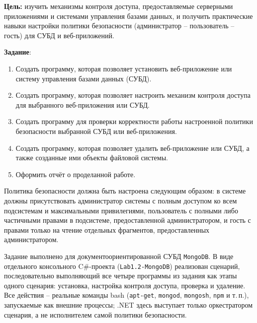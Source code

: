 
\textbf{Цель:} изучить механизмы контроля доступа, предоставляемые
серверными приложениями и системами управления базами данных, и получить
практические навыки настройки политики безопасности (администратор --
пользователь -- гость) для СУБД и веб-приложений.

\vspace{1em}

\textbf{Задание}:
\begin{enumerate}
  \item Создать программу, которая позволяет установить веб-приложение
  или систему управления базами данных (СУБД).
  \item Создать программу, которая позволяет настроить механизм контроля
  доступа для выбранного веб-приложения или СУБД.
  \item Создать программу для проверки корректности работы настроенной
  политики безопасности выбранной СУБД или веб-приложения.
  \item Создать программу, которая позволяет удалить веб-приложение или
  СУБД, а также созданные ими объекты файловой системы.
  \item Оформить отчёт о проделанной работе.
\end{enumerate}

Политика безопасности должна быть настроена следующим образом: в системе
должны присутствовать администратор системы с полным доступом ко всем
подсистемам и максимальными привилегиями, пользователь с полными либо
частичными правами в подсистеме, предоставленной администратором, и гость
с правами только на чтение отдельных фрагментов, предоставленных
администратором.

Задание выполнено для документоориентированной СУБД \texttt{MongoDB}. В
виде отдельного консольного C\#-проекта (\texttt{Lab1.2-MongoDB})
реализован сценарий, последовательно выполняющий все четыре программы из
задания как этапы одного сценария: установка, настройка контроля
доступа, проверка и удаление. Все действия -- реальные команды bash
(\texttt{apt-get}, \texttt{mongod}, \texttt{mongosh}, \texttt{npm} и
т.\,п.), запускаемые как внешние процессы; .NET здесь выступает только
оркестратором сценария, а не исполнителем самой политики безопасности.
